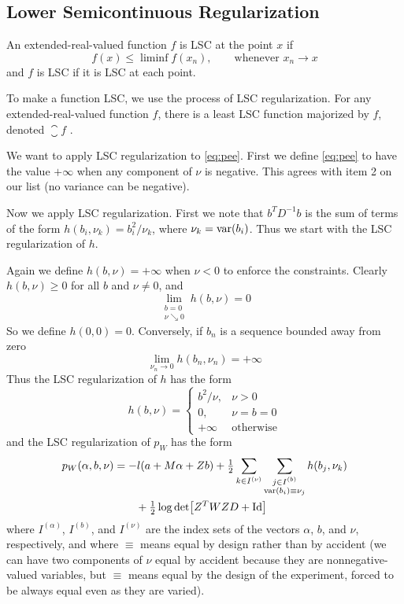 \subsection{Lower Semicontinuous Regularization}
\label{sec:lsc}

An extended-real-valued function $f$ is LSC at the point $x$ if
$$
   f(x) \le \liminf f(x_n), \qquad \text{whenever $x_n \to x$}
$$
and $f$ is LSC if it is LSC at each point.

To make a function LSC, we use the process of LSC regularization.
For any extended-real-valued function $f$, there is a least LSC function
majorized by $f$, denoted $\closure f$ \citep[Section~1.D]{rockafellar-wets}.

We want to apply LSC regularization to \eqref{eq:pee}.  First we define
\eqref{eq:pee} to have the value $+\infty$ when any component of $\nu$ is
negative.  This agrees with item 2 on our list (no variance can be negative).

Now we apply LSC regularization.  First we note that $b^T D^{-1} b$ is the
sum of terms of the form $h(b_i, \nu_k) = b_i^2 / \nu_k$,
where $\nu_k = \operatorname{var}(b_i)$.  Thus we start with the LSC regularization of $h$.

Again we define $h(b, \nu) = +\infty$ when $\nu < 0$ to enforce
the constraints.  Clearly $h(b, \nu) \ge 0$ for all $b$ and $\nu \neq 0$, and
$$
   \lim_{\substack{b = 0 \\ \nu \searrow 0}} h(b, \nu) = 0
$$
So we define $h(0, 0) = 0$.  Conversely, if $b_n$ is a sequence bounded
away from zero
$$
   \lim_{\nu_n \to 0} h(b_n, \nu_n) = + \infty
$$
Thus the LSC regularization of $h$ has the form
\begin{equation} \label{eq:h}
   h(b, \nu) =
   \begin{cases}
   b^2 / \nu, & \nu > 0
   \\
   0, & \nu = b = 0
   \\
   +\infty & \text{otherwise}
   \end{cases}
\end{equation}
and the LSC regularization of $p_W$ has the form
\begin{equation} \label{eq:pee-lsc}
\begin{split}
   p_W(\alpha, b, \nu)
   & =
   - l(a + M \alpha + Z b)
   + \tfrac{1}{2}
   \sum_{k \in I^{(\nu)}}
   \sum_{\substack{j \in I^{(b)} \\ \operatorname{var}(b_i) \equiv \nu_j}}
   h(b_j, \nu_k)
   \\
   & \qquad
   + \tfrac{1}{2} \log \det \bigl[ Z^T W Z D + \text{Id}
   \bigr]
\end{split}
\end{equation}
where $I^{(\alpha)}$, $I^{(b)}$, and $I^{(\nu)}$ are the
index sets of the vectors $\alpha$, $b$, and $\nu$, respectively,
and where
$\equiv$ means equal by design rather than by accident (we can have
two components of $\nu$ equal by accident because they are nonnegative-valued
variables, but $\equiv$ means equal by the design of the experiment,
forced to be always equal even as they are varied).

